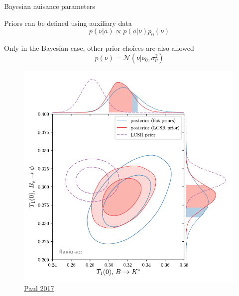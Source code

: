 \documentclass[
aspectratio=169,
14pt,
professionalfonts
]{beamer}
\begin{document}
\begin{frame}{Bayesian nuisance parameters}
    \begin{minipage}{0.6\textwidth}
        Priors can be defined using auxiliary data
        $$p(\nu|a) \propto p(a|\nu) p_0(\nu)$$
        
        Only in the Bayesian case, other prior choices are also allowed
        $$ p(\nu) = \mathcal{N}(\nu | \nu_0, \sigma_\nu^2)$$
        
    \end{minipage}
    \begin{minipage}{0.39\textwidth}
        \begin{figure}
            \centering
            \includegraphics[width=\textwidth]{../plots/straub-posterior.pdf}
            \flushright \small
        \href{https://arxiv.org/pdf/2311.14647}{Paul 2017}
        \end{figure}
    \end{minipage}
\end{frame}
    
\end{document}
